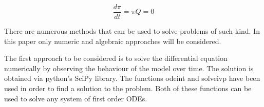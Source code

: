 \[
\frac{d\pi}{dt} = \pi Q = 0
\]

There are numerous methods that can be used to solve problems of such kind. 
In this paper only numeric and algebraic approaches will be considered. 

The first approach to be considered is to solve the differential equation numerically 
by observing the behaviour of the model over time. 
The solution is obtained via python's SciPy library. 
The functions odeint and solve\textunderscore ivp have been used in order to find 
a solution to the problem. 
Both of these functions can be used to solve any system of first order ODEs.
